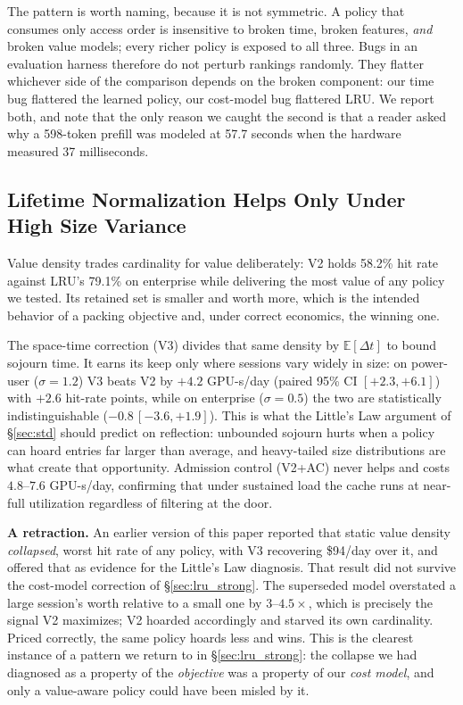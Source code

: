 \documentclass[letterpaper,twocolumn,10pt]{article}
\begin{document}
The pattern is worth naming, because it is not symmetric. A policy that consumes only access order is insensitive to broken time, broken features, \emph{and} broken value models; every richer policy is exposed to all three. Bugs in an evaluation harness therefore do not perturb rankings randomly. They flatter whichever side of the comparison depends on the broken component: our time bug flattered the learned policy, our cost-model bug flattered LRU. We report both, and note that the only reason we caught the second is that a reader asked why a 598-token prefill was modeled at 57.7 seconds when the hardware measured 37 milliseconds.

\subsection{Lifetime Normalization Helps Only Under High Size Variance}
\label{sec:whystatic}

Value density trades cardinality for value deliberately: V2 holds 58.2\% hit rate against LRU's 79.1\% on enterprise while delivering the most value of any policy we tested. Its retained set is smaller and worth more, which is the intended behavior of a packing objective and, under correct economics, the winning one.

The space-time correction (V3) divides that same density by $\mathbb{E}[\Delta t]$ to bound sojourn time. It earns its keep only where sessions vary widely in size: on power-user ($\sigma{=}1.2$) V3 beats V2 by $+4.2$ GPU-s/day (paired 95\% CI $[+2.3, +6.1]$) with $+2.6$ hit-rate points, while on enterprise ($\sigma{=}0.5$) the two are statistically indistinguishable ($-0.8$\,$[-3.6,+1.9]$). This is what the Little's Law argument of \S\ref{sec:std} should predict on reflection: unbounded sojourn hurts when a policy can hoard entries far larger than average, and heavy-tailed size distributions are what create that opportunity. Admission control (V2+AC) never helps and costs $4.8$--$7.6$ GPU-s/day, confirming that under sustained load the cache runs at near-full utilization regardless of filtering at the door.

\textbf{A retraction.} An earlier version of this paper reported that static value density \emph{collapsed}, worst hit rate of any policy, with V3 recovering \$94/day over it, and offered that as evidence for the Little's Law diagnosis. That result did not survive the cost-model correction of \S\ref{sec:lru_strong}. The superseded model overstated a large session's worth relative to a small one by $3\text{--}4.5\times$, which is precisely the signal V2 maximizes; V2 hoarded accordingly and starved its own cardinality. Priced correctly, the same policy hoards less and wins. This is the clearest instance of a pattern we return to in \S\ref{sec:lru_strong}: the collapse we had diagnosed as a property of the \emph{objective} was a property of our \emph{cost model}, and only a value-aware policy could have been misled by it.
\end{document}
